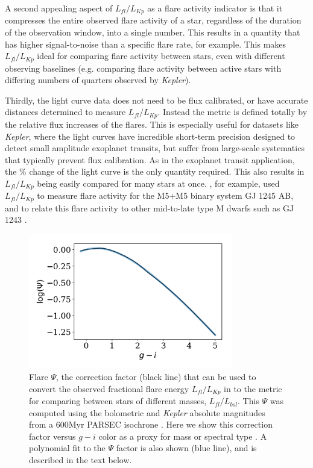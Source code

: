 \documentclass[preprint2]{aastex62}
\newcommand{\Kepler}{\textsl{Kepler}\xspace}
\begin{document}
A second appealing aspect of $L_{fl}/L_{Kp}$ as a flare activity indicator is that it compresses the entire observed flare activity of a star, regardless of the duration of the observation window, into a single number. This results in a quantity that has higher signal-to-noise than a specific flare rate, for example. This makes $L_{fl}/L_{Kp}$ ideal for comparing flare activity between stars, even with different observing baselines (e.g. comparing flare activity between active stars with differing numbers of quarters observed by \Kepler).

Thirdly, the light curve data does not need to be flux calibrated, or have accurate distances determined to measure $L_{fl}/L_{Kp}$. Instead the metric is defined totally by the relative flux increases of the flares. This is especially useful for datasets like \Kepler, where the light curves have incredible short-term precision designed to detect small amplitude exoplanet transits, but suffer from large-scale systematics that typically prevent flux calibration. As in the exoplanet transit application, the \% change of the light curve is the only quantity required. This also results in $L_{fl}/L_{Kp}$ being easily compared for many stars at once. \citet{lurie2015}, for example, used $L_{fl}/L_{Kp}$ to measure flare activity for the M5+M5 binary system GJ 1245 AB, and to relate this flare activity to other mid-to-late type M dwarfs such as GJ 1243 \citep{davenport2014b}. 



\begin{figure}[!t]
\centering
\includegraphics[width=3.5in]{fig3}
\caption{
Flare $\Psi$, the correction factor (black line) that can be used to convert the observed fractional flare energy $L_{fl}/L_{Kp}$ in to the metric for comparing between stars of different masses, $L_{fl}/L_{bol}$. This $\Psi$ was computed using the bolometric and \Kepler absolute magnitudes from a 600Myr PARSEC isochrone \citep{bressan2012}. Here we show this correction factor versus $g-i$ color as a proxy for mass or spectral type \citep[e.g. see][]{covey2007,davenport2014}. A polynomial fit to the $\Psi$ factor is also shown (blue line), and is described in the text below.
}
\label{fig:chi}
\end{figure}
\end{document}
